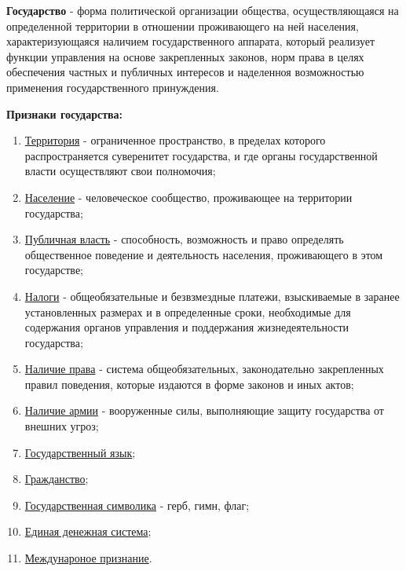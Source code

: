 \documentclass[a5paper,10pt]{article}
\begin{document}
			\textbf{Государство} - форма политической организации общества, осуществляющаяся на определенной территории в отношении проживающего на ней населения, характеризующаяся наличием государственного аппарата, который реализует функции управления на основе закрепленных законов, норм права в целях обеспечения частных и публичных интересов и наделенноя возможностью применения государственного принуждения.

			\textbf{Признаки государства:}
			\begin{enumerate}
				\item \underline{Территория} - ограниченное пространство, в пределах которого распространяется суверенитет государства, и где органы государственной власти осуществляют свои полномочия;
				
				\item \underline{Население} - человеческое сообщество, проживающее на территории государства;
				
				\item \underline{Публичная власть} - способность, возможность и право определять общественное поведение и деятельность населения, проживающего в этом государстве;
				
				\item \underline{Налоги} - общеобязательные и безвзмездные платежи, взыскиваемые в заранее установленных размерах и в определенные сроки, необходимые для содержания органов управления и поддержания жизнедеятельности государства;
				
				\item \underline{Наличие права} - система общеобязательных, законодательно закрепленных правил поведения, которые издаются в форме законов и иных актов;
				
				\item \underline{Наличие армии} - вооруженные силы, выполняющие защиту государства от внешних угроз;
				
				\item \underline{Государственный язык};
				
				\item \underline{Гражданство};
				
				\item \underline{Государственная символика} - герб, гимн, флаг;
				
				\item \underline{Единая денежная система};
				
				\item \underline{Междунароное признание}.
			\end{enumerate}
\end{document}

